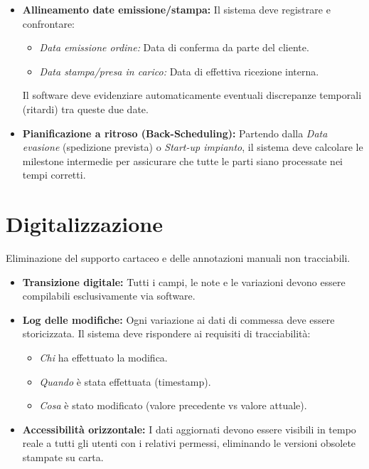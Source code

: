 \documentclass[12pt, a4paper]{article} %
\begin{document}
\begin{itemize}
    \item \textbf{Allineamento date emissione/stampa:}
          Il sistema deve registrare e confrontare:
          \begin{itemize}
              \item \textit{Data emissione ordine:} Data di conferma da parte del cliente.
              \item \textit{Data stampa/presa in carico:} Data di effettiva ricezione interna.
          \end{itemize}
          Il software deve evidenziare automaticamente eventuali discrepanze temporali (ritardi) tra queste due date.

    \item \textbf{Pianificazione a ritroso (Back-Scheduling):}
          Partendo dalla \textit{Data evasione} (spedizione prevista) o \textit{Start-up impianto}, il sistema deve calcolare le milestone intermedie per assicurare che tutte le parti siano processate nei tempi corretti.
\end{itemize}

\section{Digitalizzazione}
Eliminazione del supporto cartaceo e delle annotazioni manuali non tracciabili.

\begin{itemize}
    \item \textbf{Transizione digitale:} Tutti i campi, le note e le variazioni devono essere compilabili esclusivamente via software.
    \item \textbf{Log delle modifiche:} Ogni variazione ai dati di commessa deve essere storicizzata. Il sistema deve rispondere ai requisiti di tracciabilità:
          \begin{itemize}
              \item \textit{Chi} ha effettuato la modifica.
              \item \textit{Quando} è stata effettuata (timestamp).
              \item \textit{Cosa} è stato modificato (valore precedente vs valore attuale).
          \end{itemize}
    \item \textbf{Accessibilità orizzontale:} I dati aggiornati devono essere visibili in tempo reale a tutti gli utenti con i relativi permessi, eliminando le versioni obsolete stampate su carta.
\end{itemize}
\end{document}
